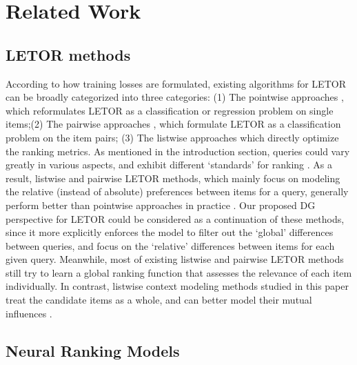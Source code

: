\documentclass[letterpaper]{article}
\begin{document}
\section{Related Work}

\subsection{LETOR methods}

According to how training losses are formulated, existing algorithms for LETOR can be broadly categorized into three categories: (1) The pointwise approaches \cite{li2008mcrank,nallapati2004discriminative}, which reformulates LETOR as a classification or regression problem on single items;(2) The pairwise approaches \cite{freund2003efficient,burges2005learning}, which formulate LETOR as a classification problem on the item pairs; (3) The listwise approaches \cite{SoftRank,000278621400005} which directly optimize the ranking metrics. As mentioned in the introduction section, queries could vary greatly in various aspects, and exhibit different `standards' for ranking \cite{sqlrank}. As a result, listwise and pairwise LETOR methods, which mainly focus on modeling the relative (instead of absolute) preferences between items for a query, generally perform better than pointwise approaches in practice \cite{karmaker2017application,cao2007learning,YahooL2R}. Our proposed DG perspective for LETOR could be considered as a continuation of these methods, since it more explicitly enforces the model to filter out the `global' differences between queries, and focus on the `relative' differences between items for each given query. Meanwhile, most of existing listwise and pairwise LETOR methods still try to learn a global ranking function that assesses the relevance of each item individually. In contrast, listwise context modeling methods studied in this paper treat the candidate items as a whole, and can better model their mutual influences \cite{zhuang2018globally}.

\subsection{Neural Ranking Models}
\end{document}

